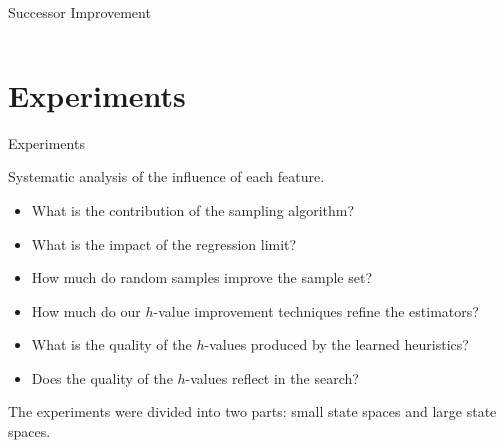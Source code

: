\documentclass[10pt]{beamer}
\providecommand{\h}{\ensuremath{h}\xspace}
\begin{document}
\begin{frame}{Successor Improvement}
\begin{columns}
\begin{column}{0.5\textwidth}
{
}
\end{column}
\end{columns}
\end{frame}

\section{Experiments}

\begin{frame}{Experiments}

Systematic analysis of the influence of each feature.
\begin{itemize}
    \item What is the contribution of the sampling algorithm?
    \item What is the impact of the regression limit?
    \item How much do random samples improve the sample set?
    \item How much do our \h-value improvement techniques refine the estimators?
    \item What is the quality of the \h-values produced by the learned heuristics?
    \item Does the quality of the \h-values reflect in the search?
\end{itemize}

\bigskip The experiments were divided into two parts: small state spaces and large state spaces.

\end{frame}
\end{document}
